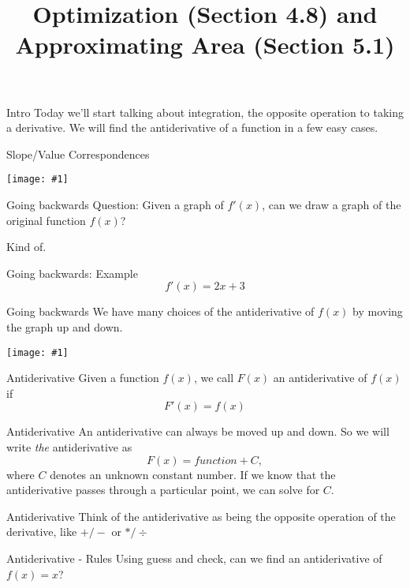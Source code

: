 \documentclass[t]{beamer}
\title{Optimization (Section 4.8) and \\Approximating Area (Section 5.1)}
\date{}
\newcommand{\img}[1]{
\vfill
\begin{center}
\texttt{[image: \#1]}
\end{center}
\vfill
}
\begin{document}
\frame{\titlepage}

\begin{frame}{Intro}
Today we'll start talking about integration, the opposite operation to
taking a derivative.  We will find the antiderivative of a function in
a few easy cases.
\end{frame}


\begin{frame}{Slope/Value Correspondences}
\img{slopes}
\end{frame}

\begin{frame}{Going backwards}
Question: Given a graph of $f'(x)$, can we draw a graph of the
original function $f(x)$?

\vspace{3in}

Kind of.

\end{frame}

\begin{frame}{Going backwards: Example}
$$f'(x) = 2x + 3$$
\end{frame}

\begin{frame}{Going backwards}
We have many choices of the antiderivative of $f(x)$ by
moving the graph up and down.
\img{gb}
\end{frame}

\begin{frame}{Antiderivative}
Given a function $f(x)$, we call $F(x)$ an antiderivative of $f(x)$ if
$$F'(x) = f(x)$$
\end{frame}

\begin{frame}{Antiderivative}
An antiderivative can always be moved up and down.  So we will
write \emph{the} antiderivative as 
$$F(x) = function + C,$$
where $C$ denotes an unknown constant number.  If we know that
the antiderivative passes through a particular point, we can 
solve for $C$.
\end{frame}

\begin{frame}{Antiderivative}
Think of the antiderivative as being the opposite operation of the 
derivative, like $+/-$ or $*/\div$
\end{frame}

\begin{frame}{Antiderivative - Rules}
Using guess and check, can we find an antiderivative of
$f(x) = x$?
\end{frame}
\end{document}

